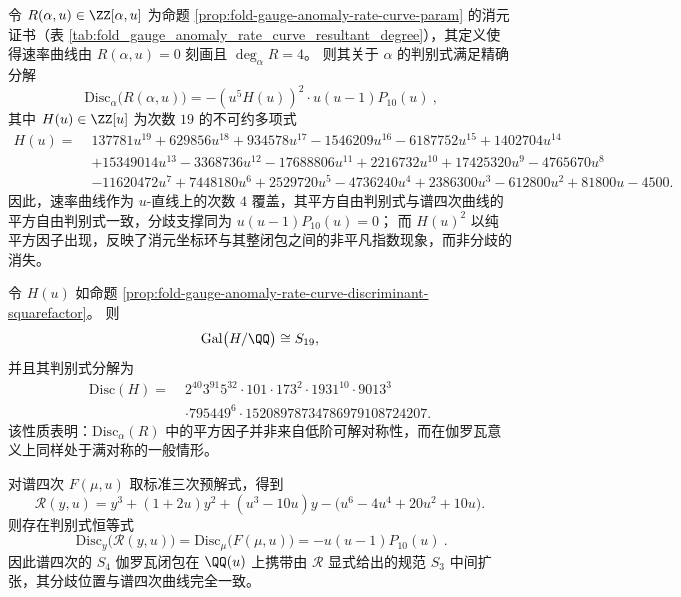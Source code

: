 \begin{proposition}[速率曲线消元模型的判别式平方因子分解]\label{prop:fold-gauge-anomaly-rate-curve-discriminant-squarefactor}
令 \(R(\alpha,u)\in\ZZ[\alpha,u]\) 为命题 \ref{prop:fold-gauge-anomaly-rate-curve-param} 的消元证书（表 \ref{tab:fold_gauge_anomaly_rate_curve_resultant_degree}），其定义使得速率曲线由 \(R(\alpha,u)=0\) 刻画且 \(\deg_{\alpha}R=4\)。
则其关于 \(\alpha\) 的判别式满足精确分解
\[
\boxed{\ \mathrm{Disc}_{\alpha}\bigl(R(\alpha,u)\bigr)=-(u^{5}H(u))^{2}\cdot u(u-1)P_{10}(u)\ },
\]
其中 \(H(u)\in\ZZ[u]\) 为次数 \(19\) 的不可约多项式
\[
\begin{aligned}
H(u)=\;&137781u^{19}+629856u^{18}+934578u^{17}-1546209u^{16}-6187752u^{15}+1402704u^{14}\\
&+15349014u^{13}-3368736u^{12}-17688806u^{11}+2216732u^{10}+17425320u^{9}-4765670u^{8}\\
&-11620472u^{7}+7448180u^{6}+2529720u^{5}-4736240u^{4}+2386300u^{3}-612800u^{2}+81800u-4500.
\end{aligned}
\]
因此，速率曲线作为 \(u\)-直线上的次数 \(4\) 覆盖，其平方自由判别式与谱四次曲线的平方自由判别式一致，分歧支撑同为 \(u(u-1)P_{10}(u)=0\)；
而 \(H(u)^{2}\) 以纯平方因子出现，反映了消元坐标环与其整闭包之间的非平凡指数现象，而非分歧的消失。
\end{proposition}

\begin{proposition}\label{prop:fold-gauge-anomaly-H-galois-discriminant}
令 \(H(u)\) 如命题 \ref{prop:fold-gauge-anomaly-rate-curve-discriminant-squarefactor}。
则
\[
\mathrm{Gal}\bigl(H/\QQ\bigr)\cong S_{19},
\]
并且其判别式分解为
\[
\begin{aligned}
\mathrm{Disc}(H)=\;&2^{40}3^{91}5^{32}\cdot 101\cdot 173^{2}\cdot 1931^{10}\cdot 9013^{3}\\
&\cdot 795449^{6}\cdot 15208978734786979108724207.
\end{aligned}
\]
该性质表明：\(\mathrm{Disc}_{\alpha}(R)\) 中的平方因子并非来自低阶可解对称性，而在伽罗瓦意义上同样处于满对称的一般情形。
\end{proposition}

\begin{proposition}[谱四次的三次预解式与判别式恒等]\label{prop:fold-gauge-anomaly-cubic-resolvent-discriminant}
对谱四次 \(F(\mu,u)\) 取标准三次预解式，得到
\[
\mathcal{R}(y,u)=y^{3}+(1+2u)y^{2}+(u^{3}-10u)y-\bigl(u^{6}-4u^{4}+20u^{2}+10u\bigr).
\]
则存在判别式恒等式
\[
\boxed{\ \mathrm{Disc}_{y}\bigl(\mathcal{R}(y,u)\bigr)=\mathrm{Disc}_{\mu}\bigl(F(\mu,u)\bigr)=-u(u-1)P_{10}(u)\ }.
\]
因此谱四次的 \(S_{4}\) 伽罗瓦闭包在 \(\QQ(u)\) 上携带由 \(\mathcal{R}\) 显式给出的规范 \(S_{3}\) 中间扩张，其分歧位置与谱四次曲线完全一致。
\end{proposition}

